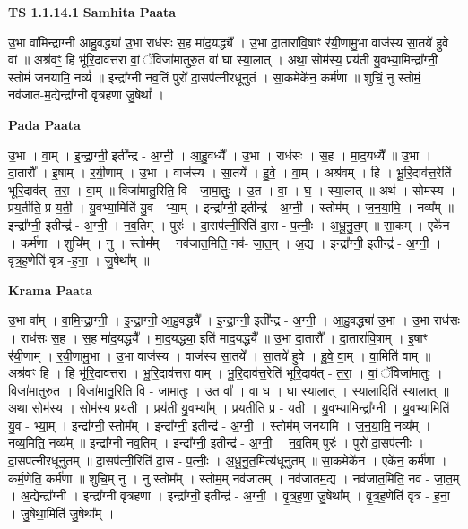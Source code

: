 \documentclass[17pt]{extarticle}
\begin{document}
\textbf{TS 1.1.14.1 } \newline
\textbf{Samhita Paata} \newline

उ॒भा वा॑मिन्द्राग्नी आहु॒वद्ध्या॑ उ॒भा राध॑सः स॒ह मा॑द॒यद्ध्यै᳚ । उ॒भा दा॒तारा॑वि॒षाꣳ र॑यी॒णामु॒भा वाज॑स्य सा॒तये॑ हुवे वां ॥ अश्र॑वꣳ॒॒ हि भू॑रि॒दाव॑त्तरा वां॒ ॅविजा॑मातुरु॒त वा॑ घा स्या॒लात् । अथा॒ सोम॑स्य॒ प्रय॑ती यु॒वभ्या॒मिन्द्रा᳚ग्नी॒ स्तोमं॑ जनयामि॒ नव्यं᳚ ॥ इन्द्रा᳚ग्नी नव॒तिं पुरो॑ दा॒सप॑त्नीरधूनुतं । सा॒कमेके॑न॒ कर्म॑णा ॥ शुचिं॒ नु स्तोमं॒ नव॑जात-म॒द्येन्द्रा᳚ग्नी वृत्रहणा जु॒षेथां᳚ । \newline

\textbf{Pada Paata} \newline

उ॒भा । वा॒म् । इ॒न्द्रा॒ग्नी॒ इती᳚न्द्र - अ॒ग्नी॒ । आ॒हु॒वध्यै᳚ । उ॒भा । राध॑सः । स॒ह । मा॒द॒यध्यै᳚ ॥ उ॒भा । दा॒तारौ᳚ । इ॒षाम् । र॒यी॒णाम् । उ॒भा । वाज॑स्य । सा॒तये᳚ । हु॒वे॒ । वा॒म् । अश्र॑वम् । हि । भू॒रि॒दाव॑त्त॒रेति॑ भूरि॒दाव॑त् -त॒रा॒ । वा॒म् ॥ विजा॑मातु॒रिति॒ वि - जा॒मा॒तुः॒ । उ॒त । वा॒ । घ॒ । स्या॒लात् ॥ अथ॑ । सोम॑स्य । प्रय॒तीति॒ प्र-य॒ती॒ । यु॒वभ्या॒मिति॑ यु॒व - भ्या॒म् । इन्द्रा᳚ग्नी॒ इतीन्द्र॑ - अ॒ग्नी॒ । स्तोम᳚म् । ज॒न॒या॒मि॒ । नव्य᳚म् ॥ इन्द्रा᳚ग्नी॒ इतीन्द्र॑ - अ॒ग्नी॒ । न॒व॒तिम् । पुरः॑ । दा॒सप॑त्नी॒रिति॑ दा॒स - प॒त्नीः॒ । अ॒धू॒नु॒त॒म् ॥ सा॒कम् । एके॑न । कर्म॑णा ॥ शुचि᳚म् । नु । स्तोम᳚म् । नव॑जात॒मिति॒ नव॑- जा॒त॒म् । अ॒द्य । इन्द्रा᳚ग्नी॒ इतीन्द्र॑ - अ॒ग्नी॒ । वृ॒त्र॒ह॒णेति॑ वृत्र -ह॒ना॒ । जु॒षेथा᳚म् ॥  \newline


\textbf{Krama Paata} \newline

उ॒भा वा᳚म् । वा॒मि॒न्द्रा॒ग्नी॒ । इ॒न्द्रा॒ग्नी॒ आ॒हु॒वद्ध्यै᳚ । इ॒न्द्रा॒ग्नी॒ इती᳚न्द्र - अ॒ग्नी॒ । आ॒हु॒वद्ध्या॑ उ॒भा । उ॒भा राध॑सः । राध॑सः स॒ह । स॒ह मा॑द॒यद्ध्यै᳚ । मा॒द॒यद्ध्या॒ इति॑ माद॒यद्ध्यै᳚ ॥ उ॒भा दा॒तारौ᳚ । दा॒तारा॑वि॒षाम् । इ॒षाꣳ र॑यी॒णाम् । र॒यी॒णामु॒भा । उ॒भा वाज॑स्य । वाज॑स्य सा॒तये᳚ । सा॒तये॑ हुवे । हु॒वे॒ वा॒म् । वा॒मिति॑ वाम् ॥ अश्र॑वꣳ॒॒ हि । हि भू॑रि॒दाव॑त्तरा । भू॒रि॒दाव॑त्तरा वाम् । भू॒रि॒दाव॑त्त॒रेति॑ भूरि॒दाव॑त् - त॒रा॒ । वां॒ ॅविजा॑मातुः । विजा॑मातुरु॒त । विजा॑मातु॒रिति॒ वि - जा॒मा॒तुः॒ । उ॒त वा᳚ । वा॒ घ॒ । घा॒ स्या॒लात् । स्या॒लादिति॑ स्या॒लात् ॥ अथा॒ सोम॑स्य । सोम॑स्य॒ प्रय॑ती । प्रय॑ती यु॒वभ्या᳚म् । प्रय॒तीति॒ प्र - य॒ती॒ । यु॒वभ्या॒मिन्द्रा᳚ग्नी । यु॒वभ्या॒मिति॑ यु॒व - भ्या॒म् । इन्द्रा᳚ग्नी॒ स्तोम᳚म् । इन्द्रा᳚ग्नी॒ इतीन्द्र॑ - अ॒ग्नी॒ । 
स्तोम॑म् जनयामि । ज॒न॒या॒मि॒ नव्य᳚म् । नव्य॒मिति॒ नव्य᳚म् ॥ 
इन्द्रा᳚ग्नी नव॒तिम् । इन्द्रा᳚ग्नी॒ इतीन्द्र॑ - अ॒ग्नी॒ । न॒व॒तिम् पुरः॑ । पुरो॑ दा॒सप॑त्नीः । दा॒सप॑त्नीरधूनुतम् ॥ दा॒सप॑त्नी॒रिति॑ दा॒स - प॒त्नीः॒ । अ॒धू॒नु॒त॒मित्य॑धूनुतम् ॥ सा॒कमेके॑न । एके॑न॒ कर्म॑णा । कर्म॒णेति॒ कर्म॑णा ॥ शुचि॒म् नु । नु स्तोम᳚म् । स्तोम॒म् नव॑जातम् । नव॑जातम॒द्य । नव॑जात॒मिति॒ नव॑ - जा॒त॒म् । अ॒द्येन्द्रा᳚ग्नी । इन्द्रा᳚ग्नी वृत्रहणा । इन्द्रा᳚ग्नी॒ इतीन्द्र॑ - अ॒ग्नी॒ । वृ॒त्र॒ह॒णा॒ जु॒षेथा᳚म् । वृ॒त्र॒ह॒णेति॑ वृत्र - ह॒ना॒ । जु॒षेथा॒मिति॑ जु॒षेथा᳚म् । \newline
\end{document}
